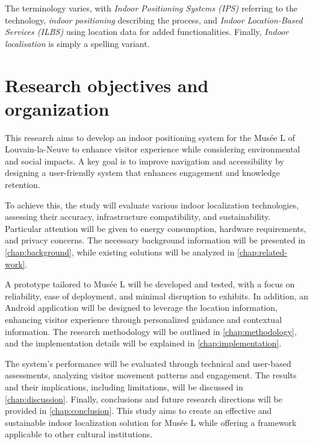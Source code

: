 The terminology varies, with \textit{Indoor Positioning Systems (IPS)}  referring to the technology, \textit{indoor positioning} describing the process, and \textit{Indoor Location-Based Services (ILBS)}  using location data for added functionalities. Finally, \textit{Indoor localisation} is simply a spelling variant. 

\section{Research objectives and organization}



This research aims to develop an indoor positioning system for the Musée L of Louvain-la-Neuve to enhance visitor experience while considering environmental and social impacts. A key goal is to improve navigation and accessibility by designing a user-friendly system that enhances engagement and knowledge retention.  

To achieve this, the study will evaluate various indoor localization technologies, assessing their accuracy, infrastructure compatibility, and sustainability. Particular attention will be given to energy consumption, hardware requirements, and privacy concerns. The necessary background information will be presented in \autoref{chap:background}, while existing solutions will be analyzed in \autoref{chap:related-work}.   

A prototype tailored to Musée L will be developed and tested, with a focus on reliability, ease of deployment, and minimal disruption to exhibits. In addition, an Android application will be designed to leverage the location information, enhancing visitor experience through personalized guidance and contextual information. The research methodology will be outlined in \autoref{chap:methodology}, and the implementation details will be explained in \autoref{chap:implementation}.   

The system’s performance will be evaluated through technical and user-based assessments, analyzing visitor movement patterns and engagement. The results and their implications, including limitations, will be discussed in \autoref{chap:discussion}. Finally, conclusions and future research directions will be provided in \autoref{chap:conclusion}. This study aims to create an effective and sustainable indoor localization solution for Musée L while offering a framework applicable to other cultural institutions. 